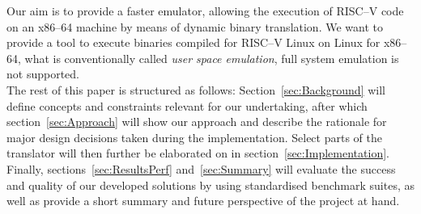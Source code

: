 Our aim is to provide a faster emulator, allowing the execution of RISC--V code on an x86--64 machine by means of dynamic binary translation.
We want to provide a tool to execute binaries compiled for RISC--V Linux on Linux for x86--64, what is conventionally called \textit{user space emulation}, full system emulation is not supported.\\

The rest of this paper is structured as follows:
Section~\ref{sec:Background} will define concepts and constraints relevant for our undertaking, after which section~\ref{sec:Approach} will show our approach and describe the rationale for major design decisions taken during the implementation.
Select parts of the translator will then further be elaborated on in section~\ref{sec:Implementation}.
Finally, sections~\ref{sec:ResultsPerf} and~\ref{sec:Summary} will evaluate the success and quality of our developed solutions by using standardised benchmark suites, as well as provide a short summary and future perspective of the project at hand.














